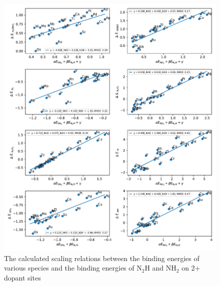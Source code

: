 \documentclass{article}
\begin{document}
\begin{figure}
\centering
\includegraphics[width=1\linewidth]{Images/scaling_species.pdf}
\caption{The calculated scaling relations between the binding energies of various species and the binding energies of N$_2$H and NH$_2$ on 2+ dopant sites}
\label{fig:scaling_species}
\end{figure}
\end{document}
